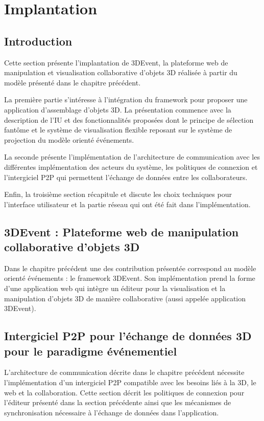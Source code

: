 
\chapter{Implantation}
\chaptertable

\section{Introduction} 
Cette section présente l'implantation de 3DEvent, la plateforme web de 
manipulation et visualisation collaborative d'objets 3D réalisée à partir du modèle 
présenté dans le chapitre précédent.

La première partie s'intéresse à l'intégration 
du framework pour proposer une application d'assemblage d'objets 3D. La 
présentation commence avec la description de l'\gls{IU} et des fonctionnalités 
proposées dont le principe de sélection fantôme et le système de visualisation 
flexible reposant sur le système de projection du modèle orienté événements. 

La seconde présente l'implémentation de l'architecture de communication avec les 
différentes implémentation des acteurs du système, les politiques de connexion et 
l'intergiciel \gls{P2P} qui permettent l'échange de données entre les collaborateurs.

Enfin, la troisième section récapitule et discute les choix techniques pour 
l'interface utilisateur et la partie réseau qui ont été fait dans l'implémentation.


\section{3DEvent : Plateforme web de manipulation collaborative d'objets 3D}
Dans le chapitre précédent une des contribution présentée correspond au 
modèle orienté événements : le \gls{framework} 3DEvent. 
Son implémentation prend la forme d'une application web qui intègre un éditeur 
pour la visualisation et la manipulation d'objets 3D de manière collaborative (aussi 
appelée \og application 3DEvent\fg{}).



\section{Intergiciel P2P pour l'échange de données 3D pour le paradigme 
événementiel}

L'architecture de communication décrite dans le chapitre précédent nécessite 
l'implémentation d'un intergiciel \gls{P2P} compatible avec les besoins liés à la 3D, le 
web et la collaboration. Cette section décrit les politiques de connexion pour 
l'éditeur présenté dans la section précédente ainsi que les mécanismes de 
synchronisation nécessaire à l'échange de données dans l'application. 

